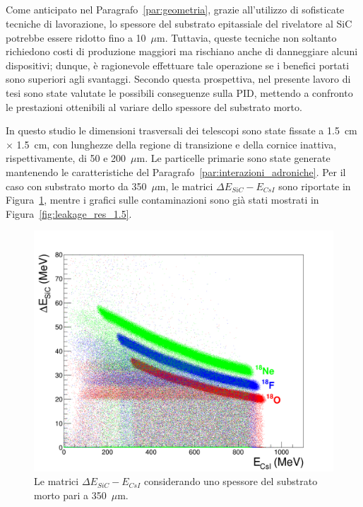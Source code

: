 \subsection{}




Come anticipato nel Paragrafo~\ref{par:geometria}, grazie all'utilizzo di sofisticate tecniche di lavorazione, lo spessore del substrato epitassiale del rivelatore al SiC potrebbe essere ridotto fino a 10~$\mu$m.
Tuttavia, queste tecniche non soltanto richiedono costi di produzione maggiori ma rischiano anche di danneggiare alcuni dispositivi;
dunque, è ragionevole effettuare tale operazione se i benefici portati sono superiori agli svantaggi.
Secondo questa prospettiva, nel presente lavoro di tesi sono state valutate le possibili conseguenze sulla PID, mettendo a confronto le prestazioni ottenibili al variare dello spessore del substrato morto.

In questo studio le dimensioni trasversali dei telescopi sono state fissate a 1.5~cm $\times$ 1.5~cm, con lunghezze della regione di transizione e della cornice inattiva, rispettivamente, di 50 e 200~$\mu$m.
Le particelle primarie sono state generate mantenendo le caratteristiche del Paragrafo~\ref{par:interazioni_adroniche}.
Per il caso con substrato morto da 350~$\mu$m, le matrici $\Delta E_{SiC} - E_{CsI}$ sono riportate in Figura~\ref{fig:deltaE_ERes_1.5}, mentre i grafici sulle contaminazioni sono già stati mostrati in Figura~\ref{fig:leakage_res_1.5}.





\begin{figure} [!t]
	\centering
	\includegraphics[width=\textwidth, keepaspectratio]{Grafici_Tesi/1.5per1.5/deltaE_ERes.png}
	\caption{Le matrici $\Delta E_{SiC} - E_{CsI}$ considerando uno spessore del substrato morto pari a 350~$\mu$m.} \label{fig:deltaE_ERes_1.5}
\end{figure}




